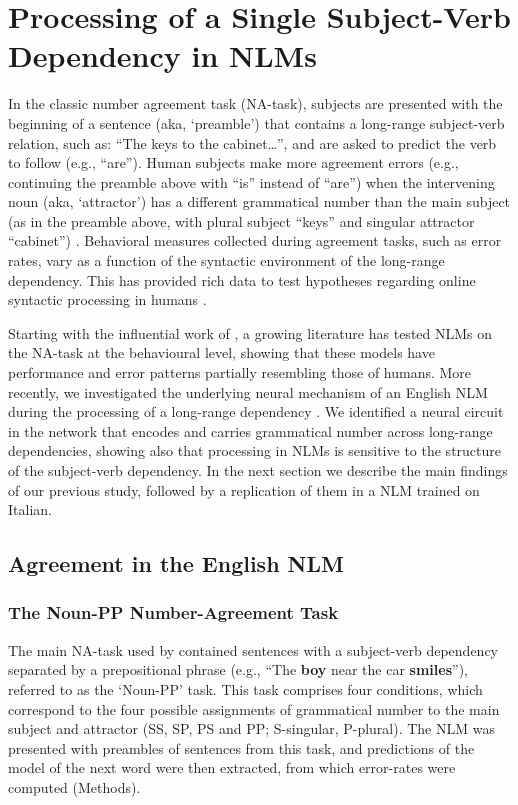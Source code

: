 \section{Processing of a Single Subject-Verb Dependency in NLMs}
In the classic number agreement task (NA-task), subjects are presented with the beginning of a sentence (aka, `preamble') that contains a long-range subject-verb relation, such as: ``The keys to the cabinet\ldots'', and are asked to predict the verb to follow (e.g., ``are''). Human subjects make more agreement errors (e.g., continuing the preamble  above with ``is'' instead of ``are'') when the intervening noun (aka, `attractor') has a different grammatical number than the main subject (as in the preamble above, with plural subject ``keys'' and singular attractor ``cabinet'') . Behavioral measures collected during agreement tasks, such as error rates, vary as a function of the syntactic environment of the long-range dependency. This has provided rich data to test hypotheses regarding online syntactic processing in humans \citep[e.g., ][]{franck2002subject, franck2006agreement, franck2007syntactic}.

Starting with the influential work of \citet{Linzen:etal:2016}, a growing
literature \citep[e.g.,][]{Gulordava:etal:2018, Bernardy:Lappin:2017,
  Giulianelli:etal:2018, Kuncoro:etal:2018a,Linzen:Leonard:2018,jumelet2019analysing} has
tested NLMs on the NA-task at the behavioural level, showing that these models have performance
and error patterns partially resembling those of humans.
More recently, we investigated the underlying neural mechanism of an
English NLM during the processing of a long-range dependency
\citep{lakretz2019emergence}. We identified a neural circuit in the
network that encodes and carries grammatical number across long-range
dependencies, showing also that processing in NLMs is sensitive to the
structure of the subject-verb dependency. In the next section we
describe the main findings of our previous study, followed by a replication of them in a NLM trained on Italian. 



\subsection{Agreement in the English NLM}

\subsubsection{The Noun-PP Number-Agreement Task}
The main NA-task used by \citet{lakretz2019emergence} contained sentences with a subject-verb dependency separated by a prepositional phrase (e.g., ``The \textbf{boy} near the car \textbf{smiles}''), referred to as the `Noun-PP' task. This task comprises four conditions, which correspond to the four possible assignments of grammatical number to the main subject and attractor (SS, SP, PS and PP; S-singular, P-plural). The NLM was presented with preambles of sentences from this task, and predictions of the model of the next word were then extracted, from which error-rates were computed (Methods). 

